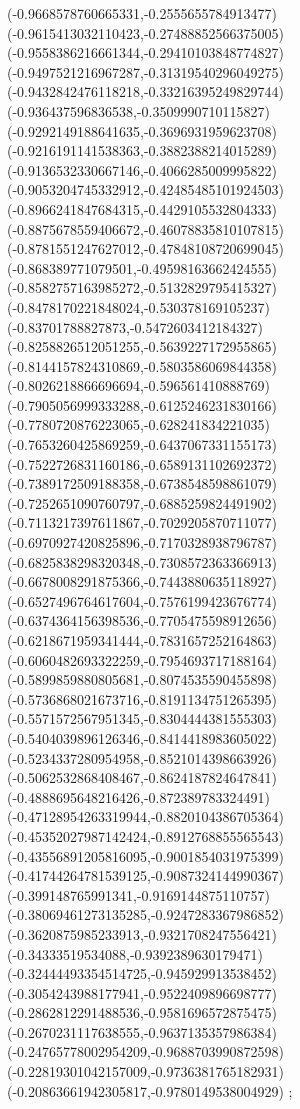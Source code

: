 {(-0.9668578760665331,-0.2555655784913477)
(-0.9615413032110423,-0.27488852566375005)
(-0.9558386216661344,-0.29410103848774827)
(-0.9497521216967287,-0.31319540296049275)
(-0.9432842476118218,-0.33216395249829744)
(-0.936437596836538,-0.3509990710115827)
(-0.9292149188641635,-0.3696931959623708)
(-0.9216191141538363,-0.3882388214015289)
(-0.9136532330667146,-0.4066285009995822)
(-0.9053204745332912,-0.42485485101924503)
(-0.8966241847684315,-0.4429105532804333)
(-0.8875678559406672,-0.46078835810107815)
(-0.8781551247627012,-0.47848108720699045)
(-0.868389771079501,-0.49598163662424555)
(-0.8582757163985272,-0.5132829795415327)
(-0.8478170221848024,-0.530378169105237)
(-0.83701788827873,-0.5472603412184327)
(-0.8258826512051255,-0.5639227172955865)
(-0.8144157824310869,-0.5803586069844358)
(-0.8026218866696694,-0.596561410888769)
(-0.7905056999333288,-0.6125246231830166)
(-0.7780720876223065,-0.628241834221035)
(-0.7653260425869259,-0.6437067331155173)
(-0.7522726831160186,-0.6589131102692372)
(-0.7389172509188358,-0.6738548598861079)
(-0.7252651090760797,-0.6885259824491902)
(-0.7113217397611867,-0.7029205870711077)
(-0.6970927420825896,-0.7170328938796787)
(-0.6825838298320348,-0.7308572363366913)
(-0.6678008291875366,-0.7443880635118927)
(-0.6527496764617604,-0.7576199423676774)
(-0.6374364156398536,-0.7705475598912656)
(-0.6218671959341444,-0.7831657252164863)
(-0.6060482693322259,-0.7954693717188164)
(-0.5899859880805681,-0.8074535590455898)
(-0.5736868021673716,-0.8191134751265395)
(-0.5571572567951345,-0.8304444381555303)
(-0.5404039896126346,-0.8414418983605022)
(-0.5234337280954958,-0.8521014398663926)
(-0.5062532868408467,-0.8624187824647841)
(-0.4888695648216426,-0.872389783324491)
(-0.47128954263319944,-0.8820104386705364)
(-0.45352027987142424,-0.8912768855565543)
(-0.43556891205816095,-0.9001854031975399)
(-0.41744264781539125,-0.9087324144990367)
(-0.399148765991341,-0.9169144875110757)
(-0.38069461273135285,-0.9247283367986852)
(-0.3620875985233913,-0.9321708247556421)
(-0.34333519534088,-0.9392389630179471)
(-0.32444493354514725,-0.945929913538452)
(-0.3054243988177941,-0.9522409896698777)
(-0.2862812291488536,-0.9581696572875475)
(-0.2670231117638555,-0.9637135357986384)
(-0.24765778002954209,-0.9688703990872598)
(-0.22819301042157009,-0.9736381765182931)
(-0.20863661942305817,-0.9780149538004929)
};
